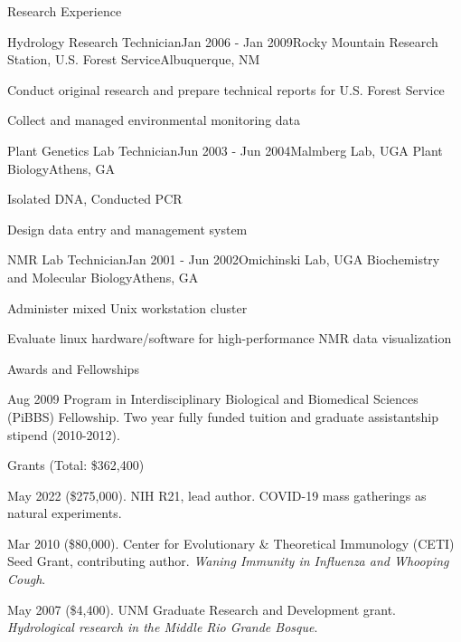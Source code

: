 \documentclass{resume} %
\begin{document}
\begin{rSection}{Research Experience}
\begin{rSubsection}{Hydrology Research Technician}{Jan 2006 - Jan 2009}{Rocky Mountain Research Station, U.S. Forest Service}{Albuquerque, NM}
\item Conduct original research and prepare technical reports for U.S. Forest Service
\item Collect and managed environmental monitoring data 
\end{rSubsection}

\begin{rSubsection}{Plant Genetics Lab Technician}{Jun 2003 - Jun 2004}{Malmberg Lab, UGA Plant Biology}{Athens, GA}
\item Isolated DNA, Conducted PCR
\item Design data entry and management system
\end{rSubsection}

\begin{rSubsection}{NMR Lab Technician}{Jan 2001 - Jun 2002}{Omichinski Lab, UGA Biochemistry and Molecular Biology}{Athens, GA}
\item Administer mixed Unix workstation cluster
\item Evaluate linux hardware/software for high-performance NMR data visualization
\end{rSubsection}
\end{rSection}


\begin{rSection}{Awards and Fellowships}
\item Aug 2009 Program in Interdisciplinary Biological and Biomedical Sciences
(PiBBS) Fellowship. Two year fully funded tuition and graduate assistantship
stipend (2010-2012).
\end{rSection}

\begin{rSection}{Grants (Total: \$362,400)}
\item May 2022 (\$275,000). NIH R21, lead author. COVID-19 mass gatherings as natural experiments.
\item Mar 2010 (\$80,000). Center for Evolutionary \& Theoretical Immunology (CETI) Seed
Grant, contributing author. {\em Waning Immunity in Influenza and Whooping Cough}.
\item May 2007 (\$4,400). UNM Graduate Research and Development grant. {\em Hydrological research in the Middle Rio Grande Bosque}. 
\end{rSection}
\end{document}
